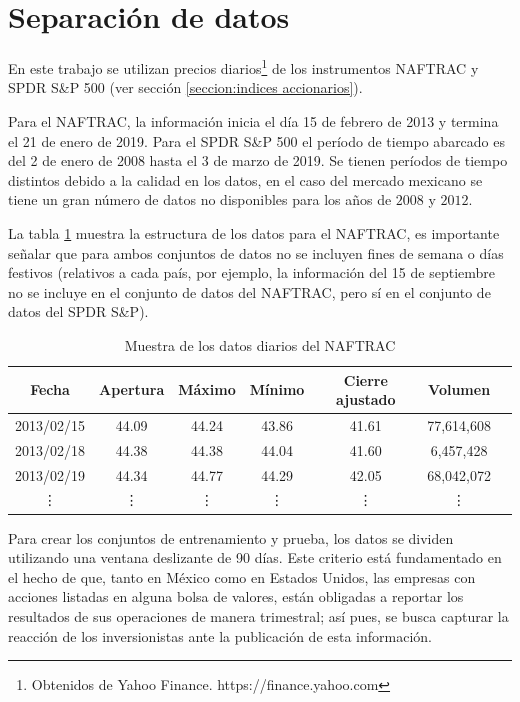 \documentclass[12pt]{report}
\theoremstyle{break}
\theoremstyle{break}
\begin{document}
\section{Separación de datos}
\label{seccion:separacion de datos}
En este trabajo se utilizan precios diarios\footnote{Obtenidos de Yahoo Finance. https://finance.yahoo.com} de los instrumentos NAFTRAC y SPDR S\&P 500 (ver sección \ref{seccion:indices accionarios}).

Para el NAFTRAC, la información inicia el día 15 de febrero de 2013 y termina el 21 de enero de 2019. Para el SPDR S\&P 500 el período de tiempo abarcado es del 2 de enero de 2008 hasta  el 3 de marzo de 2019. Se tienen períodos de tiempo distintos debido a la calidad en los datos, en el caso del mercado mexicano se tiene un gran número de datos no disponibles para los años de $2008$ y $2012$.

La tabla \ref{tabla:Ejemplo datos diarios NAFTRAC} muestra la estructura de los datos para el NAFTRAC, es importante señalar que para ambos conjuntos de datos no se incluyen fines de semana o días festivos (relativos a cada país, por ejemplo, la información del 15 de septiembre no se incluye en el conjunto de datos del NAFTRAC, pero sí en el conjunto de datos del SPDR S\&P).

\begin{table}[h]
\centering
\begin{tabular}{ccccccc}
\hline
\textbf{Fecha} & \textbf{Apertura} & \textbf{Máximo} & \textbf{Mínimo} & \textbf{Cierre  ajustado} &  \textbf{Volumen} \\
\hline
2013/02/15 & 44.09 & 44.24 & 43.86  & 41.61 & 77,614,608\\
2013/02/18 & 44.38 & 44.38 & 44.04  & 41.60 & 6,457,428\\
2013/02/19 & 44.34 & 44.77 & 44.29  & 42.05 & 68,042,072\\
\vdots & \vdots & \vdots & \vdots  & \vdots & \vdots \\
\hline
\end{tabular}
\caption{\label{tabla:Ejemplo datos diarios NAFTRAC} Muestra de los datos diarios del NAFTRAC}
\end{table}

Para crear los conjuntos de entrenamiento y prueba, los datos se dividen utilizando una ventana deslizante de 90 días. Este criterio está fundamentado en el hecho de que, tanto en México como en Estados Unidos, las empresas con acciones listadas en alguna bolsa de valores, están obligadas a reportar los resultados de sus operaciones de manera trimestral; así pues, se busca capturar la reacción de los inversionistas ante la publicación de esta información.
\end{document}

